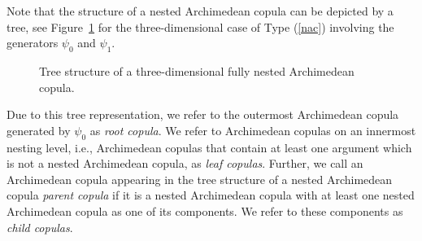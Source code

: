 \documentclass[nojss,article]{jss}
\theoremstyle{mythmstyle}
\newcommand*{\setcapwidth}[1]{}
\begin{document}
Note that the structure of a nested Archimedean copula can be depicted by a
tree, see Figure~\ref{fig:NAC_3d} for the three-dimensional case of Type
(\ref{nac}) involving the generators $\psi_0$ and $\psi_1$.
\begin{figure}[htbp]
  \centering
  \setcapwidth{\textwidth}%
  \caption{Tree structure of a three-dimensional fully nested Archimedean copula.}
  \label{fig:NAC_3d}
\end{figure}
Due to this tree representation, we refer to the outermost Archimedean copula
generated by $\psi_0$ as \textit{root copula}. We refer to Archimedean
copulas on an innermost nesting level, i.e., Archimedean copulas that
contain at least one argument which is not a nested Archimedean copula, as
\textit{leaf copulas}. Further, we call an Archimedean copula appearing in the
tree structure of a nested Archimedean copula \textit{parent copula} if it is a
nested Archimedean copula with at least one nested Archimedean copula as one of
its components. We refer to these components as \textit{child copulas}.
\end{document}
